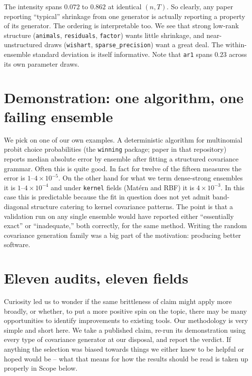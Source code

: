 \documentclass[11pt]{article}
\begin{document}
The intensity spans $0.072$ to $0.862$ at identical $(n,T)$. So clearly, any paper
reporting ``typical'' shrinkage from one generator is actually reporting a property
of its generator. The ordering is interpretable too. We see that strong low-rank structure
(\texttt{animals}, \texttt{residuals}, \texttt{factor}) wants little
shrinkage, and near-unstructured draws (\texttt{wishart},
\texttt{sparse\_precision}) want a great deal. The within-ensemble
standard deviation is itself informative. Note that \texttt{ar1} spans $0.23$ across
its own parameter draws.

\section{Demonstration: one algorithm, one failing ensemble}

We pick on one of our own examples. A deterministic algorithm for multinomial probit choice probabilities (the
\texttt{winning} package; paper in that repository) reports median
absolute error by ensemble after fitting a structured covariance grammar. Often this is quite good.
In fact for twelve of the fifteen measures the error is $1$--$4\times10^{-5}$. On the other hand for what we term dense-strong ensembles it is $1$--$4\times10^{-4}$ and under
\texttt{kernel} fields (Mat\'ern and RBF) it is $4\times10^{-3}$. In this case this is predictable because the
fit in question does not yet admit band-diagonal structure catering to kernel covariance patterns. The point is that
a validation run on any single ensemble would have reported either ``essentially
exact'' or ``inadequate,'' both correctly, for the same method. Writing the random covariance generation family was a big part of the motivation: producing better software.

\section{Eleven audits, eleven fields}

Curiosity led us to wonder if the same brittleness of claim might apply more broadly, or whether, to put a more positive spin on the topic, there may be many opportunities to identify improvements to existing tools. Our methodology is very simple and short here. We take a published claim, re-run its demonstration using every type of covariance generator at our disposal, and report the verdict. If anything the selection was biased towards things we either knew to be helpful or hoped would be -- what that means for how the results should be read is taken up properly in Scope below.
\end{document}

